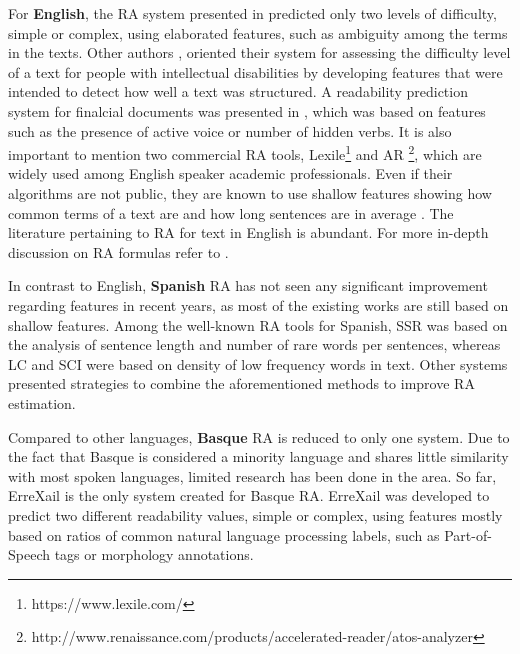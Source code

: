 \documentclass[12pt]{article}
\begin{document}
For \textbf{English}, 
the RA system presented in \cite{aluisio2010readability} predicted only two levels of difficulty, simple or complex, using elaborated features, such as ambiguity among the terms in the texts. Other authors \cite{textsimplificationWithDisabilities1}, oriented their system for assessing the difficulty level of a text for people with intellectual disabilities by developing features that were intended to detect how well a text was structured. A readability prediction system for  finalcial documents was presented in \cite{bonsall2015plain}, which was based on features such as the presence of active voice or number of hidden verbs. It is also important to mention two commercial RA tools, Lexile\footnote{https://www.lexile.com/} and AR \footnote{http://www.renaissance.com/products/accelerated-reader/atos-analyzer}, which are widely used among English speaker academic professionals. Even if their algorithms are not public, they are known to use shallow features showing how common terms of a text are and how long sentences are in average \cite{lennon2004lexile}. The literature pertaining to RA for text in English is abundant. For more in-depth discussion on RA formulas refer to \cite{feng2010comparison,benjamin2012reconstructing}.


In contrast to English, \textbf{Spanish} RA has not seen any significant improvement regarding features in recent years, as most of the existing works are still based on shallow features. Among the well-known RA tools for Spanish,  SSR \cite{spaulding1956spanish} was based on the analysis of sentence length and number of rare words per sentences, whereas LC and SCI \cite{anula2007tipos} were based on density of low frequency words in text. Other systems \cite{vstajner2013readability,drndarevic2013automatic} presented strategies to combine the aforementioned methods to improve RA estimation.





Compared to other languages, \textbf{Basque} RA is reduced to only one system. Due to the fact that Basque is considered a minority language and shares little similarity with most spoken languages, limited research has been done in the area. So far,  ErreXail \cite{gonzalez2014simple} is the only system created for Basque RA. ErreXail was developed to predict two different readability values, simple or complex, using features mostly based on ratios of common natural language processing labels, such as Part-of-Speech tags or morphology annotations.
\end{document}
